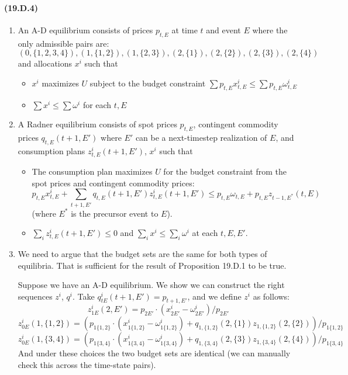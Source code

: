 \documentclass[10pt,letter]{article}
\begin{document}
\paragraph{(19.D.4)}
\begin{enumerate}[label=(\alph*)]
  \item An A-D equilibrium consists of prices $p_{t,E}$ at time $t$ and event $E$ where the only admissible pairs are:
  \[ (0,\{ 1,2,3,4\}), (1,\{1,2\}),(1,\{2,3\}),(2,\{1\}),(2,\{2\}),(2,\{3\}),(2,\{4\}) \]
  and allocations $x^i$ such that
  \begin{itemize}
    \item $x^i$ maximizes $U$ subject to the budget constraint $\sum p_{t,E}x^i_{t,E} \le \sum p_{t,E} \omega^i_{t,E}$
    \item $\sum x^i \le \sum \omega^i$ for each $t,E$
  \end{itemize}
  \item A Radner equilibrium consists of spot prices $p_{t,E}$, contingent commodity prices $q_{t,E}(t+1, E')$ where $E'$ can be a next-timestep realization of $E$, and consumption plans $z^i_{t,E}(t+1, E')$, $x^i$ such that
   \begin{itemize}
   \item The consumption plan maximizes $U$ for the budget constraint from the spot prices and contingent commodity prices:
   \[ p_{t,E} x^i_{t,E} + \sum_{t+1, E'} q_{t,E}(t+1, E')z^i_{t,E}(t+1, E') \le p_{t,E} \omega_{t,E} + p_{t,E} z_{t-1, E^*}(t, E) \]
   (where $E^*$ is the precursor event to $E$).
   \item $\sum_i z^i_{t,E} (t+1, E') \le 0 $ and $\sum_i x^i \le \sum_i \omega^i$ at each $t,E, E'$.
   \end{itemize}
  \item We need to argue that the budget sets are the same for both types of equilibria. That is sufficient for the result of Proposition 19.D.1 to be true.

  Suppose we have an A-D equilibrium. We show we can construct the right sequences $z^i$, $q^i$. Take $q^i_{tE}(t+1, E') = p_{t+1, E'}$, and we define $z^i$ as follows:
  \[ z^i_{1E}(2, E') = p_{2E'}\cdot (x^i_{2E'} - \omega^i_{2E'}) / p_{2E'}  \]
  \[ z^i_{0E}(1, \{1,2\}) = (p_{1\{1,2\}}\cdot (x^i_{1\{1,2\}} - \omega^i_{1\{1,2\}}) + q_{1,\{1,2\}}(2,\{1\})z_{1, \{1,2\}}(2,\{2\})) / p_{1\{1,2\}} \]
  \[ z^i_{0E}(1, \{3,4\}) = (p_{1\{3,4\}}\cdot (x^i_{1\{3,4\}} - \omega^i_{1\{3,4\}}) + q_{1,\{3,4\}}(2,\{3\})z_{1, \{3,4\}}(2,\{4\})) / p_{1\{3,4\}} \]
  And under these choices the two budget sets are identical (we can manually check this across the time-state pairs).


\end{enumerate}
\end{document}
